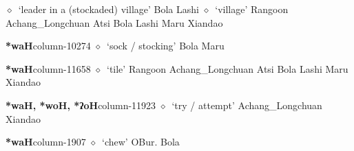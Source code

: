          $\diamond$~`leader in a (stockaded) village'
         Bola 
\hspace{1ex}
         Lashi 
\hspace{1ex}
         $\diamond$~`village'
         Rangoon 
\hspace{1ex}
         Achang\_Longchuan 
\hspace{1ex}
         Atsi 
\hspace{1ex}
         Bola 
\hspace{1ex}
         Lashi 
\hspace{1ex}
         Maru 
\hspace{1ex}
         Xiandao 
  \item {\footnotesize \textbf{*waH}}{\tiny column-10274}
         $\diamond$~`sock / stocking'
         Bola 
\hspace{1ex}
         Maru 
  \item {\footnotesize \textbf{*waH}}{\tiny column-11658}
         $\diamond$~`tile'
         Rangoon 
\hspace{1ex}
         Achang\_Longchuan 
\hspace{1ex}
         Atsi 
\hspace{1ex}
         Bola 
\hspace{1ex}
         Lashi 
\hspace{1ex}
         Maru 
\hspace{1ex}
         Xiandao 
  \item {\footnotesize \textbf{*waH, *woH, *ʔoH}}{\tiny column-11923}
         $\diamond$~`try / attempt'
         Achang\_Longchuan 
\hspace{1ex}
         Xiandao 
  \item {\footnotesize \textbf{*waH}}{\tiny column-1907}
         $\diamond$~`chew'
         OBur. 
\hspace{1ex}
         Bola 
